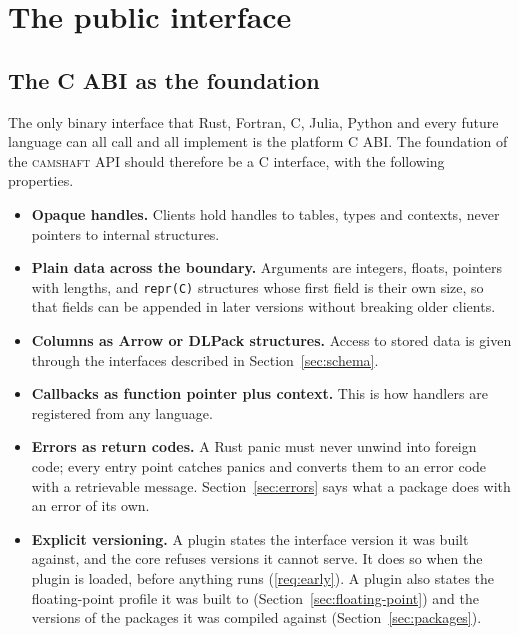 \documentclass[11pt,a4paper]{article}
\newcommand{\camshaft}{\textsc{camshaft}}
\newcommand{\code}[1]{\texttt{#1}}
\begin{document}
\section{The public interface}
\label{sec:api}

\subsection{The C ABI as the foundation}

The only binary interface that Rust, Fortran, C, Julia, Python and every
future language can all call and all implement is the platform C ABI.  The
foundation of the \camshaft{} API should therefore be a C interface, with the
following properties.

\begin{itemize}
  \item \textbf{Opaque handles.}  Clients hold handles to tables, types and
        contexts, never pointers to internal structures.
  \item \textbf{Plain data across the boundary.}  Arguments are integers,
        floats, pointers with lengths, and \code{repr(C)} structures whose
        first field is their own size, so that fields can be appended in
        later versions without breaking older clients.
  \item \textbf{Columns as Arrow or DLPack structures.}  Access to stored data
        is given through the interfaces described in
        Section~\ref{sec:schema}.
  \item \textbf{Callbacks as function pointer plus context.}  This is how
        handlers are registered from any language.
  \item \textbf{Errors as return codes.}  A Rust panic must never unwind into
        foreign code; every entry point catches panics and converts them to an
        error code with a retrievable message.  Section~\ref{sec:errors}
        says what a package does with an error of its own.
  \item \textbf{Explicit versioning.}  A plugin states the interface version
        it was built against, and the core refuses versions it cannot serve.
        It does so when the plugin is loaded, before anything runs
        (\ref{req:early}).  A plugin also states the floating-point profile
        it was built to (Section~\ref{sec:floating-point}) and the versions
        of the packages it was compiled against
        (Section~\ref{sec:packages}).
\end{itemize}
\end{document}
